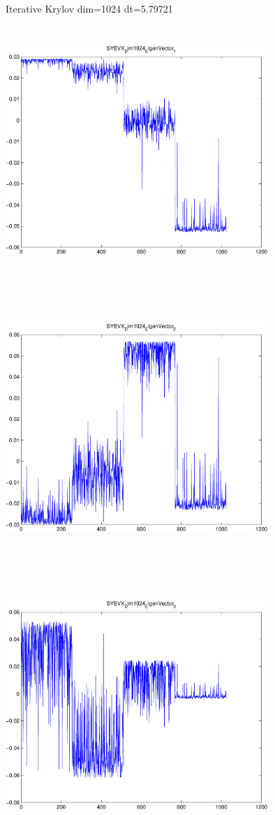 \documentclass[9pt]{article}
\theoremstyle{plain}
\theoremstyle{definition}
\theoremstyle{remark}
\numberwithin{equation}{section}
\begin{document}
Iterative Krylov dim=1024 dt=5.79721
\includegraphics[width=10.0cm,height=10.0cm]{SYEVX_Dim1024_EigenVector_1.pdf}

\includegraphics[width=10.0cm,height=10.0cm]{SYEVX_Dim1024_EigenVector_2.pdf}

\includegraphics[width=10.0cm,height=10.0cm]{SYEVX_Dim1024_EigenVector_3.pdf}
\end{document}
